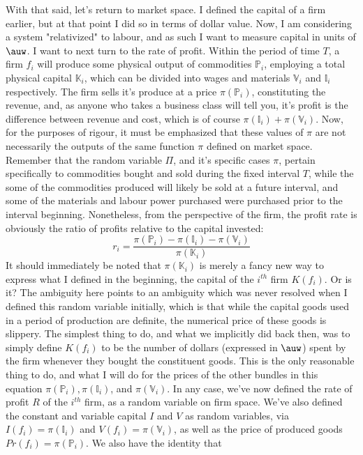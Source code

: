 \documentclass{article}
\theoremstyle{definition}
\theoremstyle{plain}
\theoremstyle{theorem}
\begin{document}
With that said, let's return to market space. I defined the capital of a firm earlier, but at that point I did so in terms of dollar value. Now, I am considering a system "relativized" to labour, and as such I want to measure capital in units of $\auw$. I want to next turn to the rate of profit. Within the period of time $T$, a firm $f_i$ will produce some physical output of commodities $\mathbb{P}_i$, employing a total physical capital $\mathbb{K}_i$, which can be divided into wages and materials $\mathbb{V}_i$ and $\mathbb{I}_i$ respectively. The firm sells it's produce at a price $\pi(\mathbb{P}_i)$, constituting the revenue, and, as anyone who takes a business class will tell you, it's profit is the difference between revenue and cost, which is of course $\pi(\mathbb{I}_i) + \pi(\mathbb{V}_i)$. Now, for the purposes of rigour, it must be emphasized that these values of $\pi$ are not necessarily the outputs of the same function $\pi$ defined on market space. Remember that the random variable $\Pi$, and it's specific cases $\pi$, pertain specifically to commodities bought and sold during the fixed interval $T$, while the some of the commodities produced will likely be sold at a future interval, and some of the materials and labour power purchased were purchased prior to the interval beginning. Nonetheless, from the perspective of the firm, the profit rate is obviously the ratio of profits relative to the capital invested:
\[ r_i = \frac{\pi(\mathbb{P}_i) - \pi(\mathbb{I}_i) - \pi(\mathbb{V}_i)}{\pi(\mathbb{K}_i)} \]   
It should immediately be noted that $\pi(\mathbb{K}_i)$ is merely a fancy new way to express what I defined in the beginning, the capital of the $i^{th}$ firm $K(f_i)$. Or is it? The ambiguity here points to an ambiguity which was never resolved when I defined this random variable initially, which is that while the capital goods used in a period of production are definite, the numerical price of these goods is slippery. The simplest thing to do, and what we implicitly did back then, was to simply define $K(f_i)$ to be the number of dollars (expressed in $\auw$) spent by the firm whenever they bought the constituent goods. This is the only reasonable thing to do, and what I will do for the prices of the other bundles in this equation $\pi(\mathbb{P}_i), \pi(\mathbb{I}_i)$, and $\pi(\mathbb{V}_i)$. In any case, we've now defined the rate of profit $R$ of the $i^{th}$ firm, as a random variable on firm space. We've also defined the constant and variable capital $I$ and $V$ as random variables, via $I(f_i) = \pi(\mathbb{I}_i)$ and $V(f_i) = \pi(\mathbb{V}_i)$, as well as the price of produced goods $Pr(f_i) = \pi(\mathbb{P}_i)$. We also have the identity that 
\end{document}
